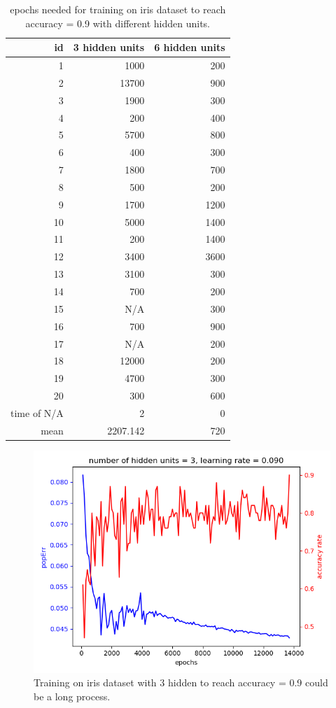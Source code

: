 \documentclass[11pt]{article}
\begin{document}
\begin{table}[htb]
\caption{epochs needed for training on iris dataset to reach accuracy = 0.9 with different hidden units.  \label{table-epochs-needed-for-accuracy}}
\centering
\begin{tabular}{rrr}
id & 3 hidden units & 6 hidden units\\
\hline
1 & 1000 & 200\\
2 & 13700 & 900\\
3 & 1900 & 300\\
4 & 200 & 400\\
5 & 5700 & 800\\
6 & 400 & 300\\
7 & 1800 & 700\\
8 & 500 & 200\\
9 & 1700 & 1200\\
10 & 5000 & 1400\\
11 & 200 & 1400\\
12 & 3400 & 3600\\
13 & 3100 & 300\\
14 & 700 & 200\\
15 & N/A & 300\\
16 & 700 & 900\\
17 & N/A & 200\\
18 & 12000 & 200\\
19 & 4700 & 300\\
20 & 300 & 600\\
\hline
time of N/A & 2 & 0\\
mean & 2207.142 & 720\\
\end{tabular}
\end{table}

\begin{figure}[htb]
\centering
\includegraphics[width=.9\linewidth]{./popErr_vs_accuracy_on_iris_3hidden_hard.png}
\caption{Training on iris dataset with 3 hidden to reach accuracy = 0.9 could be a long process. \label{fig-iris-hidden-3-long-process}}
\end{figure}
\end{document}
